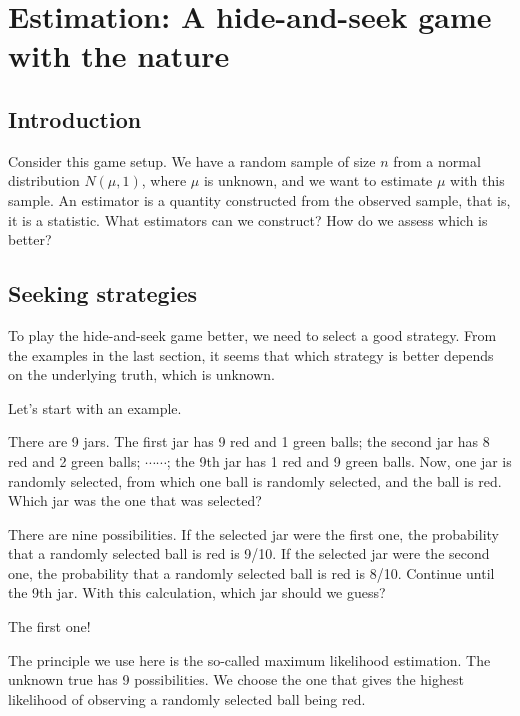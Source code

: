 \hypertarget{ch:estimation}{%
\chapter{Estimation: A hide-and-seek game with the nature}\label{ch:estimation}}


\section{Introduction}
Consider this game setup. We have a random sample of size \(n\) from a normal
distribution \(N(\mu, 1)\), where \(\mu\) is unknown, and we want to estimate \(\mu\)
with this sample. An estimator is a quantity constructed from the observed
sample, that is, it is a statistic. What estimators can we construct? How do we
assess which is better?



\section{Seeking strategies}

To play the hide-and-seek game better, we need to select a good strategy. From
the examples in the last section, it seems that which strategy is better depends
on the underlying truth, which is unknown.


Let's start with an example.
\begin{illustration}
\label{example:has-jars}
There are 9 jars. The first jar has 9 red and 1 green balls; the second jar has
8 red and 2 green balls; $\cdots\cdots$; the 9th jar has 1 red and 9 green
balls. Now, one jar is randomly selected, from which one ball is randomly
selected, and the ball is red. Which jar was the one that was selected?

There are nine possibilities. If the selected jar were the first one, the
probability that a randomly selected ball is red is 9/10. If the selected jar
were the second one, the probability that a randomly selected ball is red is
8/10. Continue until the 9th jar. With this calculation, which jar should we
guess?

The first one!
\end{illustration}

The principle we use here is the so-called maximum likelihood estimation. The
unknown true has 9 possibilities. We choose the one that gives the highest
likelihood of observing a randomly selected ball being red.





